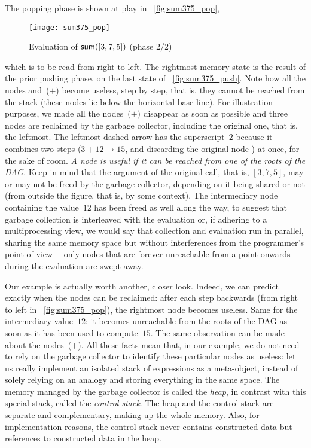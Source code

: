 The popping phase is shown at play in \fig~\vref{fig:sum375_pop},
\begin{figure}[b]
\centering
\texttt{[image: sum375\_pop]}
\caption{Evaluation of \(\textsf{sum}([3,7,5])\) (phase 2/2)}
\label{fig:sum375_pop}
\end{figure}
which is to be read from right to left. The rightmost memory state is
the result of the prior pushing phase, on the last state of
\fig~\ref{fig:sum375_push}. Note how all the nodes 
and~(\(+\)) become useless, step by step, that is, they cannot be
reached from the stack (these nodes lie below the horizontal base
line). For illustration purposes, we made all the nodes~(\(+\))
disappear as soon as possible and three nodes  are reclaimed
by the garbage collector, including the original one, that is, the
leftmost. The leftmost dashed arrow has the superscript~\(2\) because
it combines two steps (\(3+12 \rightarrow 15\), and discarding the
original node ) at once, for the sake of room. \emph{A node
  is useful if it can be reached from one of the roots of the DAG.}
Keep in mind that the argument of the original call, that is,
\([3,7,5]\), may or may not be freed by the garbage collector,
depending on it being shared or not (from outside the figure, that is,
by some context). The intermediary node containing the value~\(12\)
has been freed as well along the way, to suggest that garbage
collection is interleaved with the evaluation or, if adhering to a
multiprocessing view, we would say that collection and evaluation run
in parallel, sharing the same memory space but without interferences
from the programmer's point of view --~only nodes that are forever
unreachable from a point onwards during the evaluation are swept away.

Our example is actually worth another, closer look. Indeed, we can
predict exactly when the nodes  can be reclaimed: after each
step backwards (from right to left in \fig~\vref{fig:sum375_pop}), the
rightmost node  becomes useless. Same for the intermediary
value~\(12\): it becomes unreachable from the roots of the DAG as soon
as it has been used to compute~\(15\). The same observation can be
made about the nodes~(\(+\)). All these facts mean that, in our
example, we do not need to rely on the garbage collector to identify
these particular nodes as useless: let us really implement an isolated
stack of expressions as a meta\hyp{}object, instead of solely relying
on an analogy and storing everything in the same space. The memory
managed by the garbage collector is called the \emph{heap}, in
contrast with this special stack, called the \emph{control stack}. The
heap and the control stack are separate and complementary, making up
the whole memory. Also, for implementation reasons, the control stack
never contains constructed data but references to constructed data in
the heap.

